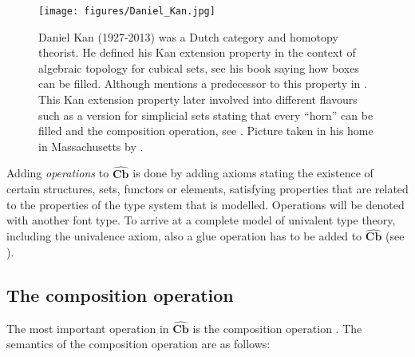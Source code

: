 \documentclass[12pt,a4paper,twoside,xetex]{book} %
\newcommand{\keyword}[1]{\emph{#1}\index{#1}}
\newcommand{\psh}[1]{\widehat{#1}}
\newcommand{\cube}[0]{\textbf{Cb}}
\begin{document}
\begin{figure}
\begin{centering}
\texttt{[image: figures/Daniel\_Kan.jpg]}
\par\end{centering}
\caption{\label{fig:Kan}Daniel Kan (1927-2013) was a Dutch category and homotopy theorist. He defined his Kan extension property  in the context of algebraic 
topology for cubical sets, see his book \cite{Kan1955} saying how boxes can be 
filled. Although \cite{Coquand2019} mentions a predecessor to this property in 
\cite{Eilenberg1939}. This Kan extension property later involved into different 
flavours such as a version for simplicial sets stating that every ``horn'' can 
be filled and the composition operation, see . Picture taken in his home in 
Massachusetts by \cite{Kan2005}.}
\end{figure}

Adding \keyword{operations} to $\psh{\cube}$ is done by adding axioms stating 
the existence of certain structures, sets, functors or elements, satisfying 
properties that are related to the properties of the type system that is 
modelled. Operations will be denoted with another font type. To arrive at a 
complete model of univalent type theory, including the univalence axiom, also a 
glue operation has to be added to $\psh{\cube}$ (see ). 

\subsection{The composition operation}

The most important operation in $\psh{\cube}$ is the composition operation 
\cite{Orton2019}. The semantics of the composition operation are as follows:
\end{document}
